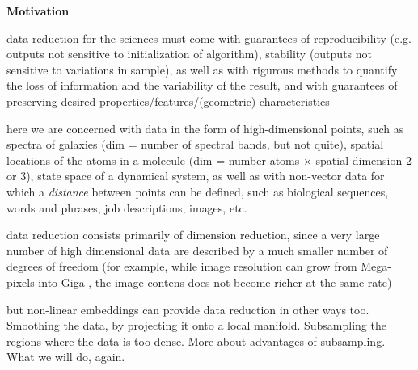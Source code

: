 \documentclass[floatfix,11pt]{article}
\begin{document}
\textbf{Motivation}
\bit
\item data reduction for the sciences must come with guarantees of
  reproducibility (e.g. outputs not sensitive to initialization of
  algorithm), stability (outputs not sensitive to variations in
  sample), as well as with rigurous methods to quantify the loss of
  information and the variability of the result, and with
  guarantees of preserving desired properties/features/(geometric)
  characteristics
\item here we are concerned with data in the form of high-dimensional points, such as spectra of galaxies (dim = number of spectral bands, but not quite), spatial locations of the atoms in a molecule (dim = number atoms $\times$ spatial dimension 2 or 3), state space of a dynamical system, as well as with non-vector data for which a {\em distance} between points can be defined, such as biological sequences, words and phrases, job descriptions, images, etc.
\item data reduction consists primarily of dimension reduction, since a very large number of high dimensional data are described by a much smaller number of degrees of freedom (for example, while image resolution can grow from Mega-pixels into Giga-, the image contens does not become richer at the same rate)
\item but non-linear embeddings can provide data reduction in other ways too. Smoothing the data, by projecting it onto a local manifold. Subsampling the regions where the data is too dense. More about advantages of subsampling.
  \eit
  What we will do, again.
\end{document}
